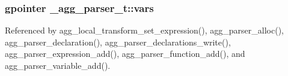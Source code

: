 \subsubsection[{vars}]{\setlength{\rightskip}{0pt plus 5cm}gpointer \+\_\+agg\+\_\+parser\+\_\+t\+::vars}\label{struct__agg__parser__t_a69b73ae942d69ed9e49584a0ee912a75}


Referenced by agg\+\_\+local\+\_\+transform\+\_\+set\+\_\+expression(), agg\+\_\+parser\+\_\+alloc(), agg\+\_\+parser\+\_\+declaration(), agg\+\_\+parser\+\_\+declarations\+\_\+write(), agg\+\_\+parser\+\_\+expression\+\_\+add(), agg\+\_\+parser\+\_\+function\+\_\+add(), and agg\+\_\+parser\+\_\+variable\+\_\+add().

